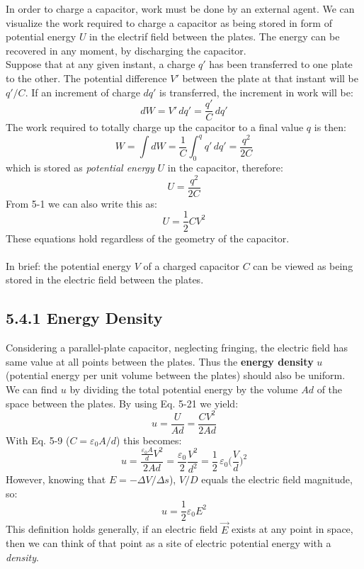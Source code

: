 \documentclass[12pt, a4paper]{article}
\begin{document}
		
		In order to charge a capacitor, work must be done by an external agent. We can visualize the work required to charge a capacitor as being stored in form of potential energy $U$ in the electrif field between the plates. The energy can be recovered in any moment, by discharging the capacitor. \\
		Suppose that at any given instant, a charge $q'$ has been transferred to one plate to the other. The potential difference $V'$ between the plate at that instant will be $q'/C$. If an increment of charge $dq'$ is transferred, the increment in work will be:
		\[
			dW = V' \, dq' = \frac{q'}{C} \, dq'
		\]
		The work required to totally charge up the capacitor to a final value $q$ is then:
		\[
			W = \int dW = \frac{1}{C} \int_{0}^{q} q' \, dq' = \frac{q^2}{2C}
		\]
		which is stored as \textit{potential energy} $U$ in the capacitor, therefore:
		\begin{equation*}
			U = \frac{q^2}{2C}
			\tag{Potential Energy, 5-20}
		\end{equation*}
		From 5-1 we can also write this as:
		\begin{equation*}
			U = \frac{1}{2} CV^2
			\tag{Potential Energy, 5-21}
		\end{equation*}
		These equations hold regardless of the geometry of the capacitor. \\ \\
		In brief: the potential energy $V$ of a charged capacitor $C$ can be viewed as being stored in the electric field between the plates.
		
		
		\subsection*{5.4.1 Energy Density}
		
		Considering a parallel-plate capacitor, neglecting fringing, the electric field has same value at all points between the plates. Thus the \textbf{energy density} $u$ (potential energy per unit volume between the plates) should also be uniform. \\
		We can find $u$ by dividing the total potential energy by the volume $Ad$ of the space between the plates. By using Eq. 5-21 we yield:
		\[
			u = \frac{U}{Ad} = \frac{CV^2}{2Ad}
			\tag{5-22}
		\]
		With Eq. 5-9 ($C = \varepsilon_0 A / d$) this becomes:
		\[
			u = \frac{ \frac{\varepsilon_0 A}{d} V^2}{2Ad}
			  = \frac{\varepsilon_0}{2} \frac{V^2}{d^2}
			  =\frac{1}{2} \, \varepsilon_0 \biggl( \frac{V}{d} \biggl)^2
			\tag{5-23}
		\]
		However, knowing that $E = - \Delta V / \Delta s$), $V / D$ equals the electric field magnitude, so:
		\begin{equation*}
			u = \frac{1}{2} \varepsilon_0 E^2
			\tag{Energy Density, 5-24}
		\end{equation*}
		This definition holds generally, if an electric field $\vec{E}$ exists at any point in space, then we can think of that point as a site of electric potential energy with a \textit{density}.
		
\end{document}
